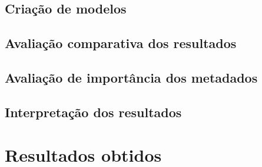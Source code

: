         \subsection{Criação de modelos}

        \subsection{Avaliação comparativa dos resultados}

        \subsection{Avaliação de importância dos metadados}

        \subsection{Interpretação dos resultados}

    \section{Resultados obtidos}


